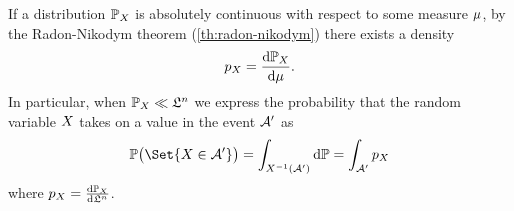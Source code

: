 If a distribution \( \mathbb{P}_X \) is absolutely continuous with respect to some measure \( \mu \), by the Radon-Nikodym theorem (\cref{th:radon-nikodym}) there exists a density
\begin{equation}
	p_X = \frac{\mathrm{d}\mathbb{P}_X}{\mathrm{d}\mu}.
\end{equation}
In particular, when \( \mathbb{P}_X \ll \mathfrak{L}^n \) we express the probability that the random variable \( X \) takes on a value in the event \( \mathcal{A}^\prime \) as
\begin{equation}
	\ProbabilityMeasure\bigl(\Set{\RandomVariable \in \Event}\bigr) = \int_{\PreImage{\RandomVariable}(\Event)} \mathrm{d}\ProbabilityMeasure = \int_{\Event} \DensityFunctionX
\end{equation}
where \( p_X = \frac{\mathrm{d}\mathbb{P}_X}{\mathrm{d}\mathfrak{L}^n} \).

